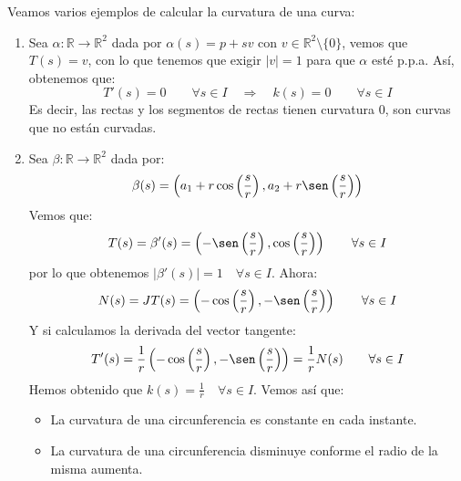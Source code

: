 \begin{ejemplo}
    Veamos varios ejemplos de calcular la curvatura de una curva:
    \begin{enumerate}
        \item Sea $\alpha:\mathbb{R}\to \mathbb{R}^2$ dada por $\alpha(s) = p+sv$ con $v\in \mathbb{R}^2\setminus \{0\}$, vemos que $T(s) = v$, con lo que tenemos que exigir $|v|=1$ para que $\alpha$ esté p.p.a. Así, obtenemos que:
            \begin{equation*}
                T'(s) = 0 \qquad \forall s\in I \quad\Longrightarrow\quad k(s) =0 \qquad \forall s\in I
            \end{equation*}
            Es decir, las rectas y los segmentos de rectas tienen curvatura $0$, son curvas que no están curvadas.
        \item Sea $\beta:\mathbb{R}\to \mathbb{R}^2$ dada por:
            \begin{equation*}
                \beta(s) = \left(a_1 + r\cos\left(\frac{s}{r}\right), a_2 + r\sen\left(\frac{s}{r}\right)\right)
            \end{equation*}
            Vemos que:
            \begin{equation*}
                T(s) = \beta'(s) = \left(-\sen\left(\frac{s}{r}\right),\cos\left(\frac{s}{r}\right)\right) \qquad \forall s\in I
            \end{equation*}
            por lo que obtenemos $|\beta'(s)| = 1 \quad \forall s\in I$. Ahora:
            \begin{equation*}
                N(s) = JT(s) = \left(-\cos\left(\frac{s}{r}\right),-\sen\left(\frac{s}{r}\right)\right) \qquad \forall s\in I
            \end{equation*}
            Y si calculamos la derivada del vector tangente:
            \begin{equation*}
                T'(s) = \frac{1}{r}\left(-\cos\left(\frac{s}{r}\right), -\sen \left(\frac{s}{r}\right)\right) = \frac{1}{r}N(s) \qquad \forall s\in I
            \end{equation*}
            Hemos obtenido que $k(s) = \frac{1}{r} \quad \forall s\in I$. Vemos así que:
            \begin{itemize}
                \item La curvatura de una circunferencia es constante en cada instante.
                \item La curvatura de una circunferencia disminuye conforme el radio de la misma aumenta.
            \end{itemize}
    \end{enumerate}
\end{ejemplo}


